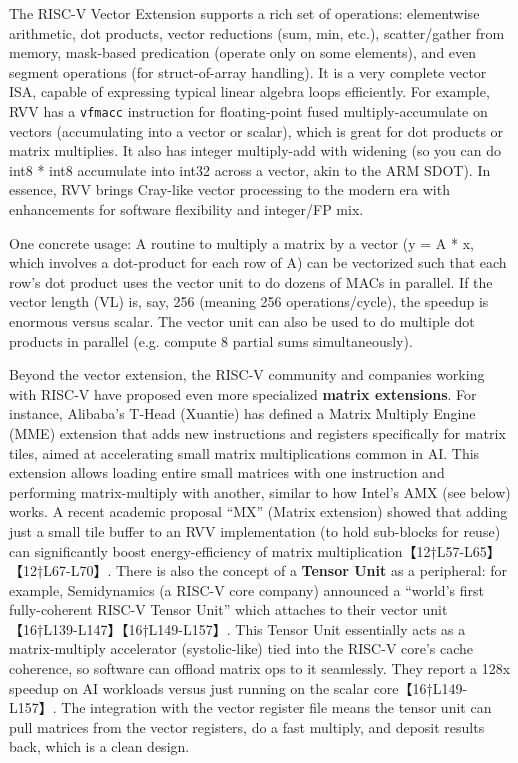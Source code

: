 The RISC-V Vector Extension supports a rich set of operations: elementwise arithmetic, dot products, vector reductions (sum, min, etc.), scatter/gather from memory, mask-based predication (operate only on some elements), and even segment operations (for struct-of-array handling). It is a very complete vector ISA, capable of expressing typical linear algebra loops efficiently. For example, RVV has a \texttt{vfmacc} instruction for floating-point fused multiply-accumulate on vectors (accumulating into a vector or scalar), which is great for dot products or matrix multiplies. It also has integer multiply-add with widening (so you can do int8 * int8 accumulate into int32 across a vector, akin to the ARM SDOT). In essence, RVV brings Cray-like vector processing to the modern era with enhancements for software flexibility and integer/FP mix.

One concrete usage: A routine to multiply a matrix by a vector (y = A * x, which involves a dot-product for each row of A) can be vectorized such that each row’s dot product uses the vector unit to do dozens of MACs in parallel. If the vector length (VL) is, say, 256 (meaning 256 operations/cycle), the speedup is enormous versus scalar. The vector unit can also be used to do multiple dot products in parallel (e.g. compute 8 partial sums simultaneously).

Beyond the vector extension, the RISC-V community and companies working with RISC-V have proposed even more specialized \textbf{matrix extensions}. For instance, Alibaba’s T-Head (Xuantie) has defined a Matrix Multiply Engine (MME) extension that adds new instructions and registers specifically for matrix tiles, aimed at accelerating small matrix multiplications common in AI. This extension allows loading entire small matrices with one instruction and performing matrix-multiply with another, similar to how Intel’s AMX (see below) works. A recent academic proposal “MX” (Matrix extension) showed that adding just a small tile buffer to an RVV implementation (to hold sub-blocks for reuse) can significantly boost energy-efficiency of matrix multiplication【12†L57-L65】【12†L67-L70】. There is also the concept of a \textbf{Tensor Unit} as a peripheral: for example, Semidynamics (a RISC-V core company) announced a “world’s first fully-coherent RISC-V Tensor Unit” which attaches to their vector unit【16†L139-L147】【16†L149-L157】. This Tensor Unit essentially acts as a matrix-multiply accelerator (systolic-like) tied into the RISC-V core’s cache coherence, so software can offload matrix ops to it seamlessly. They report a 128x speedup on AI workloads versus just running on the scalar core【16†L149-L157】. The integration with the vector register file means the tensor unit can pull matrices from the vector registers, do a fast multiply, and deposit results back, which is a clean design.

